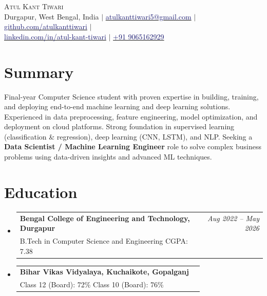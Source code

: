 \documentclass[a4paper,11pt]{article}
\makeatletter
\newcommand{\resumeEducation}[3]{
  \vspace{-2pt}\item
    \begin{tabular*}{0.97\textwidth}[t]{l@{\extracolsep{\fill}}r}
      \textbf{#1} & \textit{\small #2} \\
      \small #3 \\
    \end{tabular*}\vspace{-6pt}
}
\newcommand{\resumeSubHeadingListStart}{\begin{itemize}[leftmargin=0.15in, label={}]}
\newcommand{\resumeSubHeadingListEnd}{\end{itemize}}
\makeatother
\begin{document}
\begin{center}
    {\huge \scshape Atul Kant Tiwari} \\ \vspace{4pt}
    \small
    Durgapur, West Bengal, India $|$
    \href{mailto:atulkanttiwari5@gmail.com}{\textcolor{MidnightBlue}{atulkanttiwari5@gmail.com}} $|$
    \href{https://github.com/atulkanttiwari}{\textcolor{MidnightBlue}{github.com/atulkanttiwari}} $|$\\ \vspace{2pt}
    \href{https://www.linkedin.com/in/atul-kant-tiwari-855a71278/}{\textcolor{MidnightBlue}{linkedin.com/in/atul-kant-tiwari}} $|$
    \href{tel:+919065162929}{\textcolor{MidnightBlue}{+91 9065162929}}
\end{center}

\section{Summary}
\vspace{2pt}
\small{Final-year Computer Science student with proven expertise in building, training, and deploying end-to-end machine learning and deep learning solutions. Experienced in data preprocessing, feature engineering, model optimization, and deployment on cloud platforms. Strong foundation in supervised learning (classification \& regression), deep learning (CNN, LSTM), and NLP. Seeking a \textbf{Data Scientist / Machine Learning Engineer} role to solve complex business problems using data-driven insights and advanced ML techniques.} \vspace{4pt}

\section{Education}
\resumeSubHeadingListStart

\resumeEducation
  {Bengal College of Engineering and Technology, Durgapur}
  {Aug 2022 -- May 2026}
  {B.Tech in Computer Science and Engineering \quad CGPA: 7.38}

\resumeEducation
  {Bihar Vikas Vidyalaya, Kuchaikote, Gopalganj}
  {}
  {Class 12 (Board): 72\% \quad Class 10 (Board): 76\%}

\resumeSubHeadingListEnd

\end{document}
